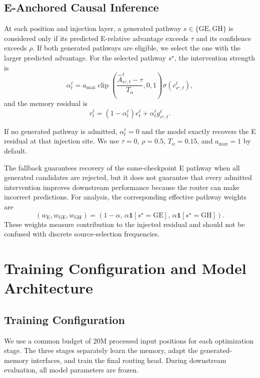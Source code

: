 \subsection{E-Anchored Causal Inference}

At each position and injection layer, a generated pathway
$s\in\{\mathrm{GE},\mathrm{GH}\}$ is considered only if its predicted
E-relative advantage exceeds $\tau$ and its confidence exceeds $\rho$.
If both generated pathways are eligible, we select the one with the larger
predicted advantage.
%
For the selected pathway $s^\star$, the intervention strength is
\begin{equation}
\alpha_t^\ell =
a_{\max}
\operatorname{clip}
\left(
\frac{\widehat A_{s^\star,t}^\ell-\tau}{T_\alpha},
0,1
\right)
\sigma(c_{s^\star,t}^\ell),
\end{equation}
and the memory residual is
\begin{equation}
r_t^\ell
=
(1-\alpha_t^\ell)e_t^\ell
+
\alpha_t^\ell g_{s^\star,t}^\ell .
\end{equation}

If no generated pathway is admitted, $\alpha_t^\ell=0$ and the model exactly
recovers the E residual at that injection site. We use
$\tau=0$, $\rho=0.5$, $T_\alpha=0.15$, and $a_{\max}=1$ by default.

The fallback guarantees recovery of the same-checkpoint E pathway when all
generated candidates are rejected, but it does not guarantee that every
admitted intervention improves downstream performance because the router can
make incorrect predictions.
%
For analysis, the corresponding effective pathway weights are
\begin{equation}
(w_{\mathrm E},w_{\mathrm{GE}},w_{\mathrm{GH}})
=
\left(
1-\alpha,\,
\alpha\mathbf{1}[s^\star=\mathrm{GE}],\,
\alpha\mathbf{1}[s^\star=\mathrm{GH}]
\right).
\end{equation}
These weights measure contribution to the injected residual and should not be
confused with discrete source-selection frequencies.
\section{Training Configuration and Model Architecture}
\label{app:training}

\subsection{Training Configuration}

We use a common budget of 20M processed input positions for each optimization
stage. The three stages separately learn the memory, adapt the generated-memory
interfaces, and train the final routing head. During downstream evaluation, all
model parameters are frozen.

